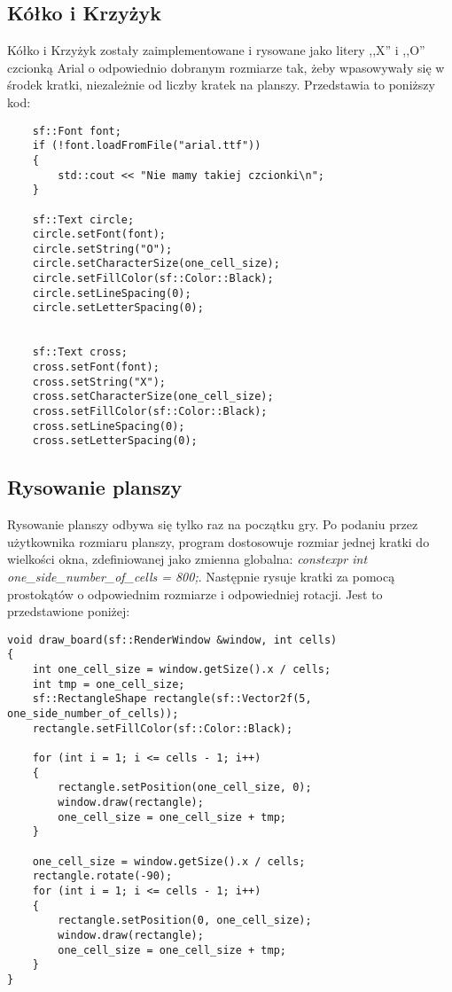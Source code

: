 \documentclass[12pt]{article}
\begin{document}
\subsection{Kółko i Krzyżyk}
Kółko i Krzyżyk zostały zaimplementowane i rysowane jako litery ,,X'' i ,,O'' czcionką Arial o odpowiednio dobranym rozmiarze tak, żeby wpasowywały się w środek kratki, niezależnie od liczby kratek na planszy. Przedstawia to poniższy kod:

\begin{lstlisting}
    sf::Font font;
    if (!font.loadFromFile("arial.ttf"))
    {
        std::cout << "Nie mamy takiej czcionki\n";
    }

    sf::Text circle;
    circle.setFont(font);
    circle.setString("O");
    circle.setCharacterSize(one_cell_size);
    circle.setFillColor(sf::Color::Black);
    circle.setLineSpacing(0);
    circle.setLetterSpacing(0);

    
    sf::Text cross;
    cross.setFont(font);
    cross.setString("X");
    cross.setCharacterSize(one_cell_size);
    cross.setFillColor(sf::Color::Black);
    cross.setLineSpacing(0);
    cross.setLetterSpacing(0);

\end{lstlisting}

\subsection{Rysowanie planszy}
Rysowanie planszy odbywa się tylko raz na początku gry. Po podaniu przez użytkownika rozmiaru planszy, program dostosowuje rozmiar jednej kratki do wielkości okna, zdefiniowanej jako zmienna globalna: \textit{constexpr int one\_side\_number\_of\_cells = 800;}. Następnie rysuje kratki za pomocą prostokątów o odpowiednim rozmiarze i odpowiedniej rotacji. Jest to przedstawione poniżej:


\begin{lstlisting}
void draw_board(sf::RenderWindow &window, int cells)
{
    int one_cell_size = window.getSize().x / cells;
    int tmp = one_cell_size;
    sf::RectangleShape rectangle(sf::Vector2f(5, one_side_number_of_cells));
    rectangle.setFillColor(sf::Color::Black);

    for (int i = 1; i <= cells - 1; i++)
    {
        rectangle.setPosition(one_cell_size, 0);
        window.draw(rectangle);
        one_cell_size = one_cell_size + tmp;
    }
    
    one_cell_size = window.getSize().x / cells;
    rectangle.rotate(-90);
    for (int i = 1; i <= cells - 1; i++)
    {
        rectangle.setPosition(0, one_cell_size);
        window.draw(rectangle);
        one_cell_size = one_cell_size + tmp;
    }
}
\end{lstlisting}
\end{document}
